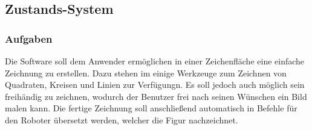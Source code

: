 
\subsection{Zustands-System}

\subsubsection{Aufgaben}
Die Software soll dem Anwender ermöglichen in einer Zeichenfläche eine einfache Zeichnung zu erstellen. Dazu stehen im einige Werkzeuge zum Zeichnen von Quadraten, Kreisen und Linien zur Verfügungn. Es soll jedoch auch möglich sein freihändig zu zeichnen, wodurch der Benutzer frei nach seinen Wünschen ein Bild malen kann. Die fertige Zeichnung soll anschließend automatisch in Befehle für den Roboter übersetzt werden, welcher die Figur nachzeichnet.

